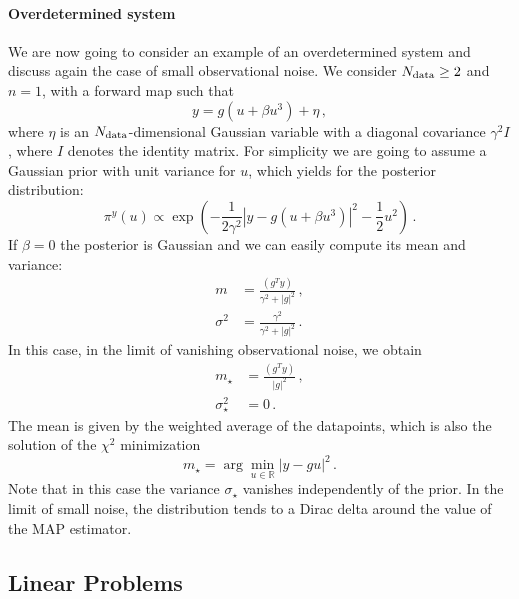 \paragraph{Overdetermined system}
We are now going to consider an example of an overdetermined system and discuss
again the case of small observational noise. We consider $N_{\rm data}\geq 2$ and
$n=1$, with a forward map such that
\begin{equation}
 \label{eq:OverDetForwMap}
 y = g(u + \beta u^3) + \eta\, ,
\end{equation} 
where $\eta$ is an $N_{\rm data}$-dimensional Gaussian variable with a diagonal
covariance $\gamma^2 I$, where $I$ denotes the identity matrix. For simplicity
we are going to assume a Gaussian prior with unit variance for $u$, which yields
for the posterior distribution:
\begin{equation}
  \label{eq:OverDetPost}
  \pi^y(u) \propto 
    \exp\left(
      -\frac{1}{2\gamma^2} \left| y - g(u + \beta u^3)\right|^2
      -\frac12 u^2
    \right)\, .
\end{equation} 
If $\beta=0$ the posterior is Gaussian and we can easily compute its mean and variance: 
\begin{align}
  m &= \frac{(g^T y)}{\gamma^2 + |g|^2} \, , \\
  \sigma^2 &=
    \frac{\gamma^2}{\gamma^2 + |g|^2}\, .
\end{align}
In this case, in the limit of vanishing observational noise, we obtain
\begin{align}
  m_\star &= \frac{(g^T y)}{|g|^2} \, ,\\
  \sigma_\star^2 &= 0\, .
\end{align}
The mean is given by the weighted average of the datapoints, which is also the solution of the $\chi^2$ minimization
\begin{equation}
  m_\star = \arg\min_{u\in\mathbb{R}} \left|y - g u\right|^2\, .
\end{equation}
Note that in this case the variance $\sigma_\star$ vanishes independently of the
prior. In the limit of small noise, the distribution tends to a Dirac delta
around the value of the MAP estimator.  

\subsection{Linear Problems}
\label{eq:LinProbs}

